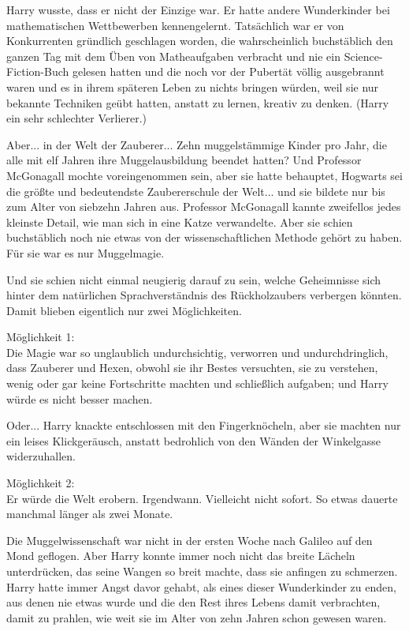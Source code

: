Harry wusste, dass er nicht der Einzige war. Er hatte andere Wunderkinder bei
mathematischen Wettbewerben kennengelernt. Tatsächlich war er von Konkurrenten
gründlich geschlagen worden, die wahrscheinlich buchstäblich den ganzen Tag mit
dem Üben von Matheaufgaben verbracht und nie ein Science-Fiction-Buch gelesen
hatten und die noch vor der Pubertät völlig ausgebrannt waren und es in ihrem
späteren Leben zu nichts bringen würden, weil sie nur bekannte Techniken geübt
hatten, anstatt zu lernen, kreativ zu denken. (Harry ein sehr schlechter
Verlierer.)

Aber... in der Welt der Zauberer... Zehn muggelstämmige Kinder pro Jahr, die
alle mit elf Jahren ihre Muggelausbildung beendet hatten? Und Professor
McGonagall mochte voreingenommen sein, aber sie hatte behauptet, Hogwarts sei
die größte und bedeutendste Zaubererschule der Welt... und sie bildete nur bis
zum Alter von siebzehn Jahren aus. Professor McGonagall kannte zweifellos jedes
kleinste Detail, wie man sich in eine Katze verwandelte. Aber sie schien
buchstäblich noch nie etwas von der wissenschaftlichen Methode gehört zu haben.
Für sie war es nur Muggelmagie.

Und sie schien nicht einmal neugierig darauf zu sein, welche Geheimnisse sich
hinter dem natürlichen Sprachverständnis des Rückholzaubers verbergen könnten.
Damit blieben eigentlich nur zwei Möglichkeiten.

Möglichkeit 1:\\
Die Magie war so unglaublich undurchsichtig, verworren und
undurchdringlich, dass Zauberer und Hexen, obwohl sie ihr Bestes versuchten, sie
zu verstehen, wenig oder gar keine Fortschritte machten und schließlich
aufgaben; und Harry würde es nicht besser machen.

Oder... Harry knackte entschlossen mit den Fingerknöcheln, aber sie machten nur
ein leises Klickgeräusch, anstatt bedrohlich von den Wänden der Winkelgasse
widerzuhallen.

Möglichkeit 2:\\
Er würde die Welt erobern. Irgendwann. Vielleicht nicht sofort.
So etwas dauerte manchmal länger als zwei Monate.

Die Muggelwissenschaft war nicht in der ersten Woche nach Galileo auf den Mond
geflogen. Aber Harry konnte immer noch nicht das breite Lächeln unterdrücken,
das seine Wangen so breit machte, dass sie anfingen zu schmerzen. Harry hatte
immer Angst davor gehabt, als eines dieser Wunderkinder zu enden, aus denen nie
etwas wurde und die den Rest ihres Lebens damit verbrachten, damit zu prahlen,
wie weit sie im Alter von zehn Jahren schon gewesen waren.

